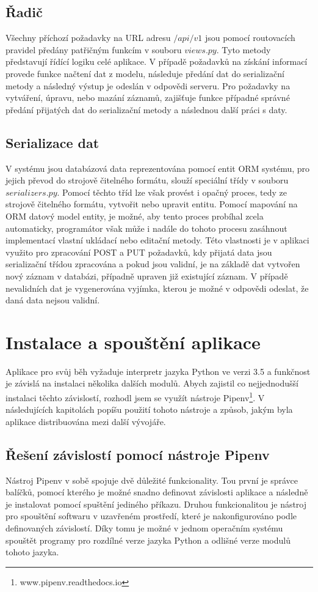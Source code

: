 \documentclass[
  digital, %
  twoside, %
  table,   %
  lof,     %
  lot,     %
]{fithesis3}
\begin{document}
\subsection{Řadič}
Všechny příchozí požadavky na URL adresu $/api/v1$ jsou pomocí routovacích pravidel předány patřičným funkcím v souboru $views.py$. Tyto metody představují řídící logiku celé aplikace. V případě požadavků na získání informací provede funkce načtení dat z modelu, následuje předání dat do serializační metody a následný výstup je odeslán v odpovědi serveru. Pro požadavky na vytváření, úpravu, nebo mazání záznamů, zajišťuje funkce případné správné předání přijatých dat do serializační metody a následnou další práci s daty. 

\subsection{Serializace dat}

V systému jsou databázová data reprezentována pomocí entit ORM systému, pro jejich převod do strojově čitelného formátu, slouží speciální třídy v souboru $serializers.py$. Pomocí těchto tříd lze však provést i opačný proces, tedy ze strojově čitelného formátu, vytvořit nebo upravit entitu. Pomocí mapování na ORM datový model entity, je možné, aby tento proces probíhal zcela automaticky, programátor však může i nadále do tohoto procesu zasáhnout implementací vlastní ukládací nebo editační metody. Této vlastnosti je v aplikaci využito pro zpracování POST a PUT požadavků, kdy přijatá data jsou serializační třídou zpracována a pokud jsou validní, je na základě dat vytvořen nový záznam v databázi, případně upraven již existující záznam. V případě nevalidních dat je vygenerována vyjímka, kterou je možné v odpovědi odeslat, že daná data nejsou validní.

\section{Instalace a spouštění aplikace}
Aplikace pro svůj běh vyžaduje interpretr jazyka Python ve verzi 3.5 a funkčnost je závislá na instalaci několika dalších modulů. Abych zajistil co nejjednodušší instalaci těchto závislostí, rozhodl jsem se využít nástroje Pipenv\footnote{www.pipenv.readthedocs.io}. V následujících kapitolách popíšu použití tohoto nástroje a způsob, jakým byla aplikace distribuována mezi další vývojáře.

\subsection{Řešení závislostí pomocí nástroje Pipenv}
Nástroj Pipenv v sobě spojuje dvě důležité funkcionality. Tou první je správce balíčků, pomocí kterého je možné snadno definovat závislosti aplikace a následně je instalovat pomocí spuštění jediného příkazu. Druhou funkcionalitou je nástroj pro spouštění softwaru v uzavřeném prostředí, které je nakonfigurováno podle definovaných závislostí. Díky tomu je možné v jednom operačním systému spouštět programy pro rozdílné verze jazyka Python a odlišné verze modulů tohoto jazyka.
\end{document}
